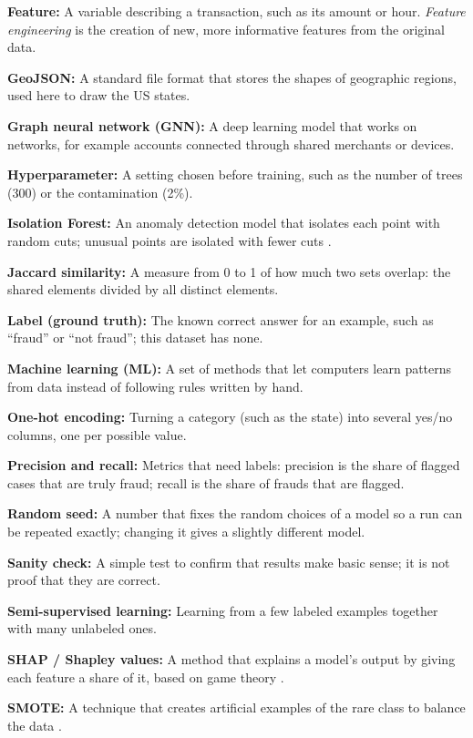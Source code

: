\documentclass[journal]{IEEEtran}
\begin{document}
\textbf{Feature:} A variable describing a transaction, such as its amount or hour. \textit{Feature engineering} is the creation of new, more informative features from the original data.

\textbf{GeoJSON:} A standard file format that stores the shapes of geographic regions, used here to draw the US states.

\textbf{Graph neural network (GNN):} A deep learning model that works on networks, for example accounts connected through shared merchants or devices.

\textbf{Hyperparameter:} A setting chosen before training, such as the number of trees (300) or the contamination (2\%).

\textbf{Isolation Forest:} An anomaly detection model that isolates each point with random cuts; unusual points are isolated with fewer cuts \cite{liu2008isolation}.

\textbf{Jaccard similarity:} A measure from 0 to 1 of how much two sets overlap: the shared elements divided by all distinct elements.

\textbf{Label (ground truth):} The known correct answer for an example, such as ``fraud'' or ``not fraud''; this dataset has none.

\textbf{Machine learning (ML):} A set of methods that let computers learn patterns from data instead of following rules written by hand.

\textbf{One-hot encoding:} Turning a category (such as the state) into several yes/no columns, one per possible value.

\textbf{Precision and recall:} Metrics that need labels: precision is the share of flagged cases that are truly fraud; recall is the share of frauds that are flagged.

\textbf{Random seed:} A number that fixes the random choices of a model so a run can be repeated exactly; changing it gives a slightly different model.

\textbf{Sanity check:} A simple test to confirm that results make basic sense; it is not proof that they are correct.

\textbf{Semi-supervised learning:} Learning from a few labeled examples together with many unlabeled ones.

\textbf{SHAP / Shapley values:} A method that explains a model's output by giving each feature a share of it, based on game theory \cite{lundberg2017unified}.

\textbf{SMOTE:} A technique that creates artificial examples of the rare class to balance the data \cite{chawla2002smote}.
\end{document}

